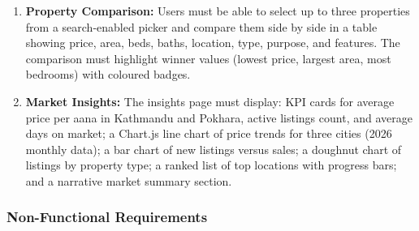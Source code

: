 \documentclass[12pt,a4paper]{report}
\begin{document}
\begin{enumerate}[leftmargin=2.5em]
  \item \textbf{Property Comparison:}
    Users must be able to select up to three properties from a search-enabled
    picker and compare them side by side in a table showing price, area, beds,
    baths, location, type, purpose, and features. The comparison must highlight
    winner values (lowest price, largest area, most bedrooms) with coloured
    badges.

  \item \textbf{Market Insights:}
    The insights page must display: KPI cards for average price per aana in
    Kathmandu and Pokhara, active listings count, and average days on market;
    a Chart.js line chart of price trends for three cities (2026 monthly data);
    a bar chart of new listings versus sales; a doughnut chart of listings by
    property type; a ranked list of top locations with progress bars; and a
    narrative market summary section.
\end{enumerate}

\subsubsection{Non-Functional Requirements}
\end{document}
